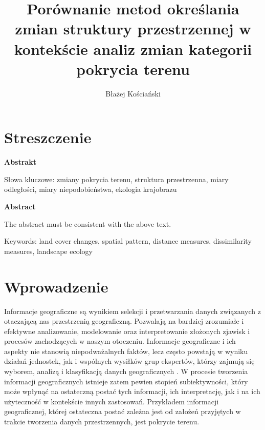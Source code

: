 \documentclass{amuthesis}
\author{Błażej Kościański}
\title{Porównanie metod określania zmian struktury przestrzennej w
kontekście analiz zmian kategorii pokrycia terenu}
\begin{document}

\titlepage


\hypertarget{streszczenie}{%
\chapter*{Streszczenie}\label{streszczenie}}


\textbf{Abstrakt}

Słowa kluczowe: zmiany pokrycia terenu, struktura przestrzenna, miary
odległości, miary niepodobieństwa, ekologia krajobrazu

\textbf{Abstract}

The abstract must be consistent with the above text.

Keywords: land cover changes, spatial pattern, distance measures,
dissimilarity measures, landscape ecology

\newpage

\sf\tighttoc\doublespacing


\hypertarget{sec-wprowadzenie}{%
\chapter{Wprowadzenie}\label{sec-wprowadzenie}}

Informacje geograficzne są wynikiem selekcji i przetwarzania danych
związanych z otaczającą nas przestrzenią geograficzną. Pozwalają na
bardziej zrozumiałe i efektywne analizowanie, modelowanie oraz
interpretowanie złożonych zjawisk i procesów zachodzących w naszym
otoczeniu. Informacje geograficzne i ich aspekty nie stanowią
niepodważalnych faktów, lecz często powstają w wyniku działań jednostek,
jak i wspólnych wysiłków grup ekspertów, którzy zajmują się wyborem,
analizą i klasyfikacją danych geograficznych \autocite{WhatIsLandCover}.
W procesie tworzenia informacji geograficznych istnieje zatem pewien
stopień subiektywności, który może wpłynąć na ostateczną postać tych
informacji, ich interpretację, jak i na ich użyteczność w kontekście
innych zastosowań. Przykładem informacji geograficznej, której
ostateczna postać zależna jest od założeń przyjętych w trakcie tworzenia
danych przestrzennych, jest pokrycie terenu.
\end{document}
